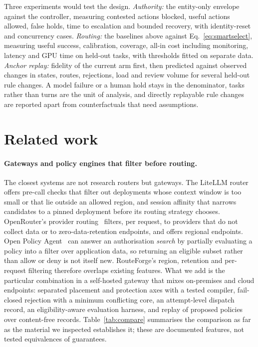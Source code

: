 \documentclass[11pt]{article}
\begin{document}
Three experiments would test the design. \emph{Authority:} the entity-only envelope against the
controller, measuring contested actions blocked, useful actions allowed, false holds, time to
escalation and bounded recovery, with identity-reset and concurrency cases. \emph{Routing:} the
baselines above against Eq.~\eqref{eq:smartselect}, measuring useful success, calibration,
coverage, all-in cost including monitoring, latency and GPU time on held-out tasks, with
thresholds fitted on separate data. \emph{Anchor replay:} fidelity of the current arm first,
then predicted against observed changes in states, routes, rejections, load and review volume
for several held-out rule changes. A model failure or a human hold stays in the denominator,
tasks rather than turns are the unit of analysis, and directly replayable rule changes are
reported apart from counterfactuals that need assumptions.

\section{Related work}
\label{sec:related}

\paragraph{Gateways and policy engines that filter before routing.} The closest systems are
not research routers but gateways. The LiteLLM router~\cite{litellm} offers pre-call checks that
filter out deployments whose context window is too small or that lie outside an allowed region,
and session affinity that narrows candidates to a pinned deployment before its routing strategy
chooses. OpenRouter's provider routing~\cite{openrouter} filters, per request, to providers that
do not collect data or to zero-data-retention endpoints, and offers regional endpoints. Open
Policy Agent~\cite{opa} can answer an authorisation \emph{search} by partially evaluating a
policy into a filter over application data, so returning an eligible subset rather than allow or
deny is not itself new. RouteForge's region, retention and per-request filtering therefore
overlaps existing features. What we add is the particular combination in a self-hosted gateway
that mixes on-premises and cloud endpoints: separated placement and protection axes with a
tested compiler, fail-closed rejection with a minimum conflicting core, an attempt-level
dispatch record, an eligibility-aware evaluation harness, and replay of proposed policies over
content-free records. Table~\ref{tab:compare} summarises the comparison as far as the material we
inspected establishes it; these are documented features, not tested equivalences of guarantees.
\end{document}

